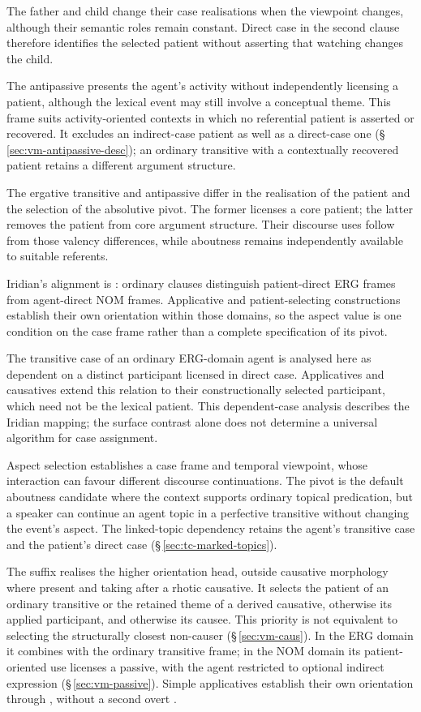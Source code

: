 The father and child change their case realisations when the viewpoint
changes, although their semantic roles remain constant. Direct case in the
second clause therefore identifies the selected patient without asserting
that watching changes the child.

The antipassive presents the agent's activity without independently licensing
a patient, although the lexical event may still involve a conceptual theme.
This frame suits activity-oriented contexts in which no referential patient is
asserted or recovered. It excludes an indirect-case patient as well as a
direct-case one (§\,\ref{sec:vm-antipassive-desc}); an ordinary transitive
with a contextually recovered patient retains a different argument structure.

The ergative transitive and antipassive differ in the realisation of the
 patient and the selection of the absolutive pivot. The former licenses a
 core patient; the latter removes the patient from core argument structure.
 Their discourse uses follow from those valency differences, while aboutness
 remains independently available to suitable referents.

Iridian's alignment is : ordinary clauses distinguish
patient-direct ERG frames from agent-direct NOM frames. Applicative and
patient-selecting constructions establish their own orientation within those
domains, so the aspect value is one condition on the case frame rather than a
complete specification of its pivot.

The transitive case of an ordinary ERG-domain agent is analysed here as
dependent on a distinct participant licensed in direct case. Applicatives and
causatives extend this relation to their constructionally selected participant,
which need not be the lexical patient. This dependent-case analysis describes
the Iridian mapping; the surface contrast alone does not determine a universal
algorithm for case assignment.

Aspect selection establishes a case frame and temporal viewpoint, whose
 interaction can favour different discourse continuations. The pivot is the
 default aboutness candidate where the context supports ordinary topical
 predication, but a speaker can continue an agent topic in a perfective
 transitive without changing the event's aspect. The linked-topic dependency
 retains the agent's transitive case and the patient's direct case
 (§\,\ref{sec:tc-marked-topics}).

The suffix  realises the higher orientation head, outside causative
morphology where present and taking  after a rhotic causative.
It selects the patient of an ordinary transitive or
the retained theme of a derived causative, otherwise its applied participant,
and otherwise its causee. This priority is not equivalent to selecting the
structurally closest non-causer (§\,\ref{sec:vm-caus}). In the ERG domain it
combines with the ordinary transitive frame; in the NOM domain its
patient-oriented use licenses a passive, with the agent restricted to optional
indirect expression (§\,\ref{sec:vm-passive}). Simple applicatives establish
their own orientation through , without a second overt .

